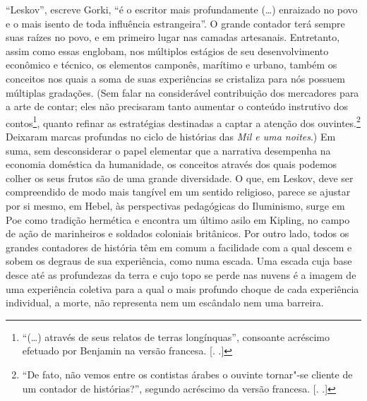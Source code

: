 ``Leskov'', escreve Gorki, ``é o escritor mais profundamente (\ldots{})
enraizado no povo e o mais isento de toda influência estrangeira''. O
grande contador terá sempre suas raízes no povo, e em primeiro lugar nas
camadas artesanais. Entretanto, assim como essas englobam, nos múltiplos
estágios de seu desenvolvimento econômico e técnico, os elementos
camponês, marítimo e urbano, também os conceitos nos quais a soma de
suas experiências se cristaliza para nós possuem múltiplas gradações. 
(Sem falar na considerável contribuição dos mercadores para a arte de
contar; eles não precisaram tanto aumentar o conteúdo instrutivo dos
contos\footnote{``(\ldots{}) através de seus relatos de terras longínquas'',
  consoante acréscimo efetuado por Benjamin na versão francesa. [. 
  .]}, quanto refinar as estratégias destinadas a captar a atenção
dos ouvintes.\footnote{``De fato, não vemos entre os contistas árabes o
  ouvinte tornar"-se cliente de um contador de histórias?'', segundo
  acréscimo da versão francesa. [. .]} Deixaram marcas
profundas no ciclo de histórias das \emph{Mil e uma noites}.) Em suma,
sem desconsiderar o papel elementar que a narrativa desempenha na
economia doméstica da humanidade, os conceitos através dos quais podemos
colher os seus frutos são de uma grande diversidade. O que, em Leskov,
deve ser compreendido de modo mais tangível em um sentido religioso,
parece se ajustar por si mesmo, em Hebel, às perspectivas pedagógicas do
Iluminismo, surge em Poe como tradição hermética e encontra um último
asilo em Kipling, no campo de ação de marinheiros e soldados coloniais
britânicos. Por outro lado, todos os grandes contadores de história têm
em comum a facilidade com a qual descem e sobem os degraus de sua
experiência, como numa escada. Uma escada cuja base desce até as
profundezas da terra e cujo topo se perde nas nuvens é a imagem de uma
experiência coletiva para a qual o mais profundo choque de cada
experiência individual, a morte, não representa nem um escândalo nem uma
barreira.

